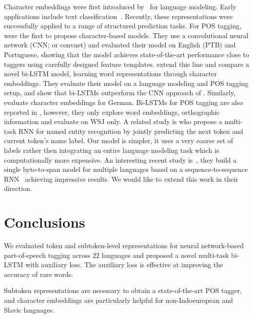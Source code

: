 \documentclass[11pt]{article}
\begin{document}
Character embeddings were first introduced by~ for language modeling. Early applications include text classification~\cite{chrupala:2013,zhang:ea:2015:char}.  Recently, these representations were successfully applied to a range of structured prediction tasks. For POS tagging, 
 were the first to propose character-based models. 
They use a convolutional neural network (CNN; or convnet) and evaluated their model on English (PTB) and Portuguese, showing that the model achieves 
state-of-the-art performance close to taggers using carefully designed feature templates.  extend this line and compare 
a novel bi-LSTM model, learning word representations through character embeddings. They evaluate their model on a language modeling and POS tagging setup,
and show that bi-LSTMs outperform the CNN approach of . %
Similarly,  evaluate character embeddings for German. 
Bi-LSTMs for POS tagging are also reported in , however, they only explore word embeddings, 
orthographic information and evaluate on WSJ only. 
A related study is  who propose a multi-task RNN for named entity recognition by jointly predicting the
next token and current token's name label. Our model is simpler, it uses a very coarse set of labels rather then integrating an entire language modeling
task which is computationally more expensive. An interesting recent study is~, they build a single byte-to-span model for multiple
languages based on a sequence-to-sequence RNN~\cite{sutskever:ea:2014} achieving impressive results. We would like to extend this work in their direction.



\section{Conclusions}
We evaluated token and subtoken-level representations for neural network-based 
part-of-speech tagging across 22 languages and proposed a novel multi-task bi-LSTM
with auxiliary loss. The auxiliary loss is effective at improving the accuracy of rare words. 

Subtoken representations are necessary to obtain a state-of-the-art POS 
tagger, and character embeddings are particularly helpful for non-Indoeuropean and Slavic languages. 
\end{document}
